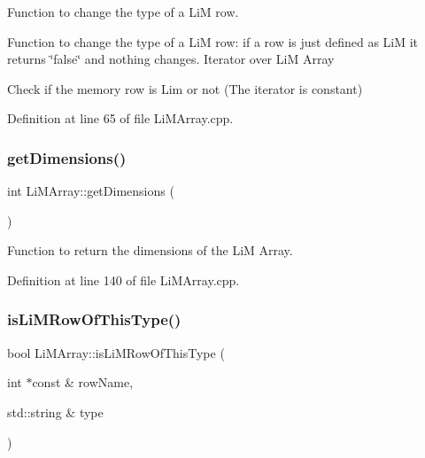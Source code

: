 Function to change the type of a LiM row. 

Function to change the type of a LiM row\+: if a row is just defined as LiM it returns \char`\"{}false\char`\"{} and nothing changes. Iterator over LiM Array

Check if the memory row is Lim or not (The iterator is constant) 

Definition at line 65 of file Li\+M\+Array.\+cpp.

\mbox{\label{classoctantis_1_1LiMArray_ac73a80ad67e747b43662ef149518509b}} 
\subsubsection{\texorpdfstring{get\+Dimensions()}{getDimensions()}}
{\footnotesize\ttfamily int Li\+M\+Array\+::get\+Dimensions (\begin{DoxyParamCaption}{ }\end{DoxyParamCaption})}



Function to return the dimensions of the LiM Array. 



Definition at line 140 of file Li\+M\+Array.\+cpp.

\mbox{\label{classoctantis_1_1LiMArray_ac52cead51baeecbb4cefe4c9ee88ea21}} 
\subsubsection{\texorpdfstring{is\+Li\+M\+Row\+Of\+This\+Type()}{isLiMRowOfThisType()}}
{\footnotesize\ttfamily bool Li\+M\+Array\+::is\+Li\+M\+Row\+Of\+This\+Type (\begin{DoxyParamCaption}\item[{int $\ast$const \&}]{row\+Name,  }\item[{std\+::string \&}]{type }\end{DoxyParamCaption})}



